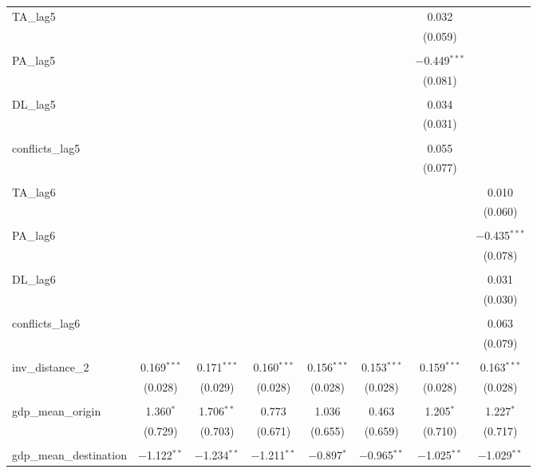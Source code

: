 \begin{table}[!htbp]
\begin{tabular}{@{\extracolsep{5pt}}lccccccc}
 TA\_lag5 &  &  &  &  &  & 0.032 &  \\ 
  &  &  &  &  &  & (0.059) &  \\ 
  & & & & & & & \\ 
 PA\_lag5 &  &  &  &  &  & $-$0.449$^{***}$ &  \\ 
  &  &  &  &  &  & (0.081) &  \\ 
  & & & & & & & \\ 
 DL\_lag5 &  &  &  &  &  & 0.034 &  \\ 
  &  &  &  &  &  & (0.031) &  \\ 
  & & & & & & & \\ 
 conflicts\_lag5 &  &  &  &  &  & 0.055 &  \\ 
  &  &  &  &  &  & (0.077) &  \\ 
  & & & & & & & \\ 
 TA\_lag6 &  &  &  &  &  &  & 0.010 \\ 
  &  &  &  &  &  &  & (0.060) \\ 
  & & & & & & & \\ 
 PA\_lag6 &  &  &  &  &  &  & $-$0.435$^{***}$ \\ 
  &  &  &  &  &  &  & (0.078) \\ 
  & & & & & & & \\ 
 DL\_lag6 &  &  &  &  &  &  & 0.031 \\ 
  &  &  &  &  &  &  & (0.030) \\ 
  & & & & & & & \\ 
 conflicts\_lag6 &  &  &  &  &  &  & 0.063 \\ 
  &  &  &  &  &  &  & (0.079) \\ 
  & & & & & & & \\ 
 inv\_distance\_2 & 0.169$^{***}$ & 0.171$^{***}$ & 0.160$^{***}$ & 0.156$^{***}$ & 0.153$^{***}$ & 0.159$^{***}$ & 0.163$^{***}$ \\ 
  & (0.028) & (0.029) & (0.028) & (0.028) & (0.028) & (0.028) & (0.028) \\ 
  & & & & & & & \\ 
 gdp\_mean\_origin & 1.360$^{*}$ & 1.706$^{**}$ & 0.773 & 1.036 & 0.463 & 1.205$^{*}$ & 1.227$^{*}$ \\ 
  & (0.729) & (0.703) & (0.671) & (0.655) & (0.659) & (0.710) & (0.717) \\ 
  & & & & & & & \\ 
 gdp\_mean\_destination & $-$1.122$^{**}$ & $-$1.234$^{**}$ & $-$1.211$^{**}$ & $-$0.897$^{*}$ & $-$0.965$^{**}$ & $-$1.025$^{**}$ & $-$1.029$^{**}$ \\ 

\end{tabular}
\end{table}
